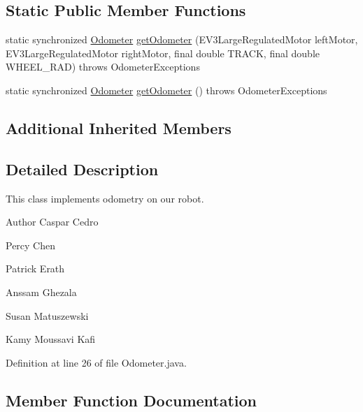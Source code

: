 \subsection*{Static Public Member Functions}
\begin{DoxyCompactItemize}
\item 
static synchronized \hyperlink{classca_1_1mcgill_1_1ecse211_1_1odometer_1_1_odometer}{Odometer} \hyperlink{classca_1_1mcgill_1_1ecse211_1_1odometer_1_1_odometer_a99171f11e34dea918fa9dd069d721439}{get\+Odometer} (E\+V3\+Large\+Regulated\+Motor left\+Motor, E\+V3\+Large\+Regulated\+Motor right\+Motor, final double T\+R\+A\+CK, final double W\+H\+E\+E\+L\+\_\+\+R\+AD)  throws Odometer\+Exceptions 
\item 
static synchronized \hyperlink{classca_1_1mcgill_1_1ecse211_1_1odometer_1_1_odometer}{Odometer} \hyperlink{classca_1_1mcgill_1_1ecse211_1_1odometer_1_1_odometer_a4e069b5a96cd43b29af0785244a99b51}{get\+Odometer} ()  throws Odometer\+Exceptions 
\end{DoxyCompactItemize}
\subsection*{Additional Inherited Members}


\subsection{Detailed Description}
This class implements odometry on our robot.

\begin{DoxyAuthor}{Author}
Caspar Cedro 

Percy Chen 

Patrick Erath 

Anssam Ghezala 

Susan Matuszewski 

Kamy Moussavi Kafi 
\end{DoxyAuthor}


Definition at line 26 of file Odometer.\+java.



\subsection{Member Function Documentation}
\mbox{\label{classca_1_1mcgill_1_1ecse211_1_1odometer_1_1_odometer_a99171f11e34dea918fa9dd069d721439}} 
